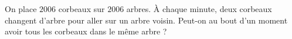 On place $2006$ corbeaux sur $2006$ arbres. À chaque minute, deux corbeaux changent d'arbre pour aller sur un arbre voisin. Peut-on au bout d'un moment avoir tous les corbeaux dans le même arbre ?

